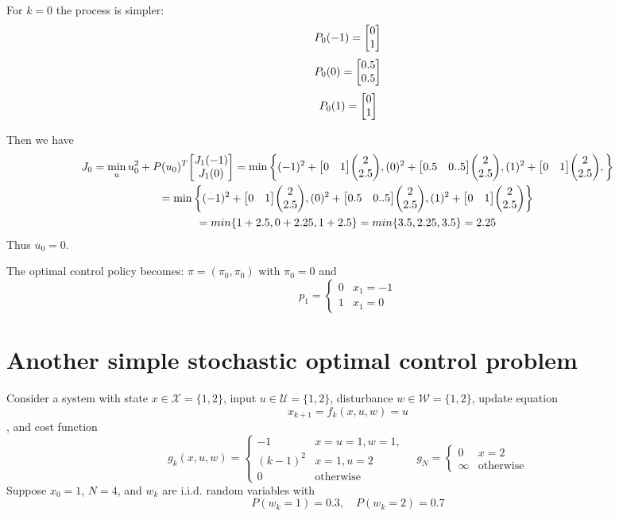 \documentclass[]{article}
\begin{document}
For $k=0$ the process is simpler:\[
    P_0(-1) = \mqty[0\\1]
\]\[
    P_0(0) = \mqty[0.5\\0.5]
\]\[
    P_0(1) = \mqty[0\\1]
\]

Then we have \begin{multline}
    J_0 = \min_{u} u_0^2 + P(u_0)^T\mqty[J_1(-1)\\J_1(0)]
    = \min \qty{
        (-1)^2 + \mqty[0&1] \mqty(2\\2.5),
        (0)^2 + \mqty[0.5&0..5] \mqty(2\\2.5),
        (1)^2 + \mqty[0&1] \mqty(2\\2.5),
    }\\
    = \min \qty{
        (-1)^2 + \mqty[0&1] \mqty(2\\2.5),
        (0)^2 + \mqty[0.5&0..5] \mqty(2\\2.5),
        (1)^2 + \mqty[0&1] \mqty(2\\2.5)
    } \\
    = min \qty{
        1+2.5,
        0+ 2.25,
        1+2.5
    }
    = min \qty{
        3.5,
        2.25,
        3.5
    }
    = 2.25
\end{multline}
Thus $u_0 = 0$.

The optimal control policy becomes:
    $\pi = (\pi_0, \pi_0)$
    with $\pi_0 = 0$ and \[ 
        p_1 = \begin{cases}
            0 & x_1 = -1\\
            1 & x_1 = 0
        \end{cases}
\]

\newpage
\section{Another simple stochastic optimal control problem}
Consider a system with state $x \in \mathcal{X} = \{1,2\}$, input $u \in \mathcal{U} = \{1,2\}$, disturbance $w \in \mathcal{W} = \{1,2\}$, update equation \[x_{k+1} = f_k(x,u,w) = u\], and cost function \[
    g_k(x,u,w) = \begin{cases}
        -1 & x = u = 1, w=1,\\
        (k-1)^2 & x=1, u=2\\
        0 &\text{otherwise}
    \end{cases}
    \quad g_{N} = \begin{cases}
        0 & x=2\\
        \infty & \text{otherwise}
    \end{cases}
\]
Suppose $x_0 = 1$, $N = 4$, and $w_k$ are i.i.d. random variables with \[
    P(w_k = 1) = 0.3, \quad P(w_k=2) = 0.7
\]
\end{document}
